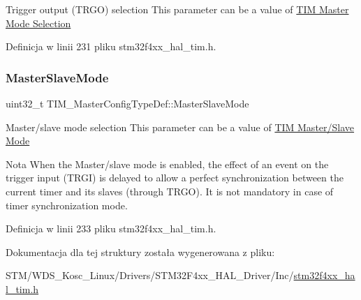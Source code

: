 Trigger output (T\+R\+GO) selection This parameter can be a value of \hyperlink{group___t_i_m___master___mode___selection}{T\+IM Master Mode Selection} 

Definicja w linii 231 pliku stm32f4xx\+\_\+hal\+\_\+tim.\+h.

\mbox{\label{struct_t_i_m___master_config_type_def_a45ddfca310a1180e19fc24b36f8e9585}} 
\subsubsection{\texorpdfstring{Master\+Slave\+Mode}{MasterSlaveMode}}
{\footnotesize\ttfamily uint32\+\_\+t T\+I\+M\+\_\+\+Master\+Config\+Type\+Def\+::\+Master\+Slave\+Mode}

Master/slave mode selection This parameter can be a value of \hyperlink{group___t_i_m___master___slave___mode}{T\+IM Master/\+Slave Mode} \begin{DoxyNote}{Nota}
When the Master/slave mode is enabled, the effect of an event on the trigger input (T\+R\+GI) is delayed to allow a perfect synchronization between the current timer and its slaves (through T\+R\+GO). It is not mandatory in case of timer synchronization mode. 
\end{DoxyNote}


Definicja w linii 233 pliku stm32f4xx\+\_\+hal\+\_\+tim.\+h.



Dokumentacja dla tej struktury została wygenerowana z pliku\+:\begin{DoxyCompactItemize}
\item 
S\+T\+M/\+W\+D\+S\+\_\+\+Kosc\+\_\+\+Linux/\+Drivers/\+S\+T\+M32\+F4xx\+\_\+\+H\+A\+L\+\_\+\+Driver/\+Inc/\hyperlink{stm32f4xx__hal__tim_8h}{stm32f4xx\+\_\+hal\+\_\+tim.\+h}\end{DoxyCompactItemize}
